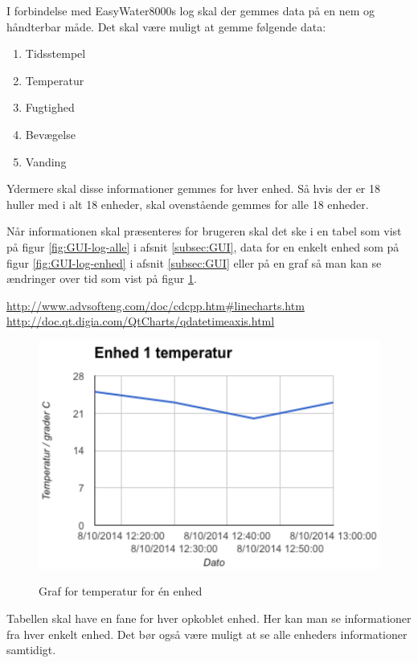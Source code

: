 
I forbindelse med EasyWater8000s log skal der gemmes data på en nem og håndterbar måde. Det skal være muligt at gemme følgende data:

\begin{enumerate}
	\item Tidsstempel
	\item Temperatur
	\item Fugtighed
	\item Bevægelse
	\item Vanding
\end{enumerate}

Ydermere skal disse informationer gemmes for hver enhed. Så hvis der er 18 huller med i alt 18 enheder, skal ovenstående gemmes for alle 18 enheder.

Når informationen skal præsenteres for brugeren skal det ske i en tabel som vist på figur \ref{fig:GUI-log-alle} i afsnit \ref{subsec:GUI}, data for en enkelt enhed som på figur \ref{fig:GUI-log-enhed} i afsnit \ref{subsec:GUI} eller på en graf så man kan se ændringer over tid som vist på figur \ref{fig:log-graf}.

\url{http://www.advsofteng.com/doc/cdcpp.htm#linecharts.htm} \newline
\url{http://doc.qt.digia.com/QtCharts/qdatetimeaxis.html}

\begin{figure}[htbp] \centering
{\includegraphics[scale=0.5]{filer/pics/SW-Log-graf}}
\caption{Graf for temperatur for én enhed}
\label{fig:log-graf}
\end{figure}

Tabellen skal have en fane for hver opkoblet enhed. Her kan man se informationer fra hver enkelt enhed. Det bør også være muligt at se alle enheders informationer samtidigt.

